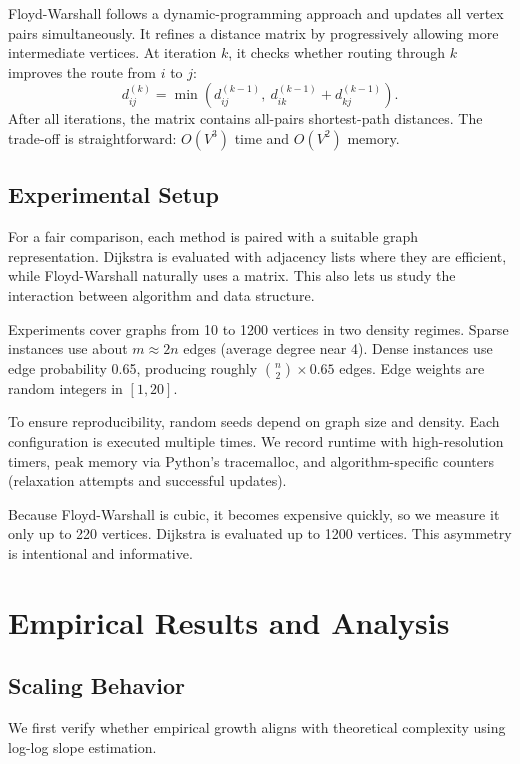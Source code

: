 \documentclass{labreport}
\begin{document}
Floyd-Warshall follows a dynamic-programming approach and updates all vertex pairs simultaneously. It refines a distance matrix by progressively allowing more intermediate vertices. At iteration $k$, it checks whether routing through $k$ improves the route from $i$ to $j$:
\[
    d_{ij}^{(k)} = \min\left(d_{ij}^{(k-1)},\ d_{ik}^{(k-1)} + d_{kj}^{(k-1)}\right).
\]
After all iterations, the matrix contains all-pairs shortest-path distances. The trade-off is straightforward: $O(V^3)$ time and $O(V^2)$ memory.

\subsection{Experimental Setup}

For a fair comparison, each method is paired with a suitable graph representation. Dijkstra is evaluated with adjacency lists where they are efficient, while Floyd-Warshall naturally uses a matrix. This also lets us study the interaction between algorithm and data structure.

Experiments cover graphs from 10 to 1200 vertices in two density regimes. Sparse instances use about $m \approx 2n$ edges (average degree near 4). Dense instances use edge probability 0.65, producing roughly $\binom{n}{2} \times 0.65$ edges. Edge weights are random integers in $[1, 20]$.

To ensure reproducibility, random seeds depend on graph size and density. Each configuration is executed multiple times. We record runtime with high-resolution timers, peak memory via Python's tracemalloc, and algorithm-specific counters (relaxation attempts and successful updates).

Because Floyd-Warshall is cubic, it becomes expensive quickly, so we measure it only up to 220 vertices. Dijkstra is evaluated up to 1200 vertices. This asymmetry is intentional and informative.

\section{Empirical Results and Analysis}

\subsection{Scaling Behavior}

We first verify whether empirical growth aligns with theoretical complexity using log-log slope estimation.
\end{document}
